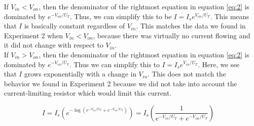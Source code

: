 \documentclass{article}
\begin{document}
\begin{itemize}
        If $V_{in} < V_{on}$, then the denominator of the rightmost equation in equation \ref{eq:2} is dominated by $e^{-V_{on}/U_T}$. Thus, we can simplify this to be $I = I_se^{V_{on}/U_T}$. This means that $I$ is basically constant regardless of $V_{in}$. This matches the data we found in Experiment 2 when $V_{in} < V_{on}$, because there was virtually no current flowing and it did not change with respect to $V_{in}$. \\

        If $V_{in} > V_{on}$, then the denominator of the rightmost equation in equation \ref{eq:2} is dominated by $e^{-V_{in}/U_T}$. Thus we can simplify this to $I = I_se^{V_{in}/U_T}$. Here, we see that $I$ grows exponentially with a change in $V_{in}$. This does not match the behavior we found in Experiment 2 because we did not take into account the current-limiting resistor which would limit this current.

        \begin{equation} \label{eq:2}
            I = I_s\left(e^{-\log(e^{-V_{in}/U_T} + e^{-V_{on}/U_T})}\right) = I_s\left(\frac{1}{e^{-V_{in}/U_T} + e^{-V_{on}/U_T}} \right)
        \end{equation}
\end{itemize}
\end{document}
